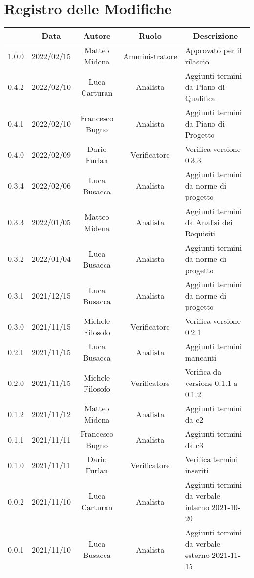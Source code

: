 \thispagestyle{empty}
\section*{Registro delle Modifiche}

\begin{center}
	\renewcommand{\arraystretch}{1.8}
	\begin{longtable}[c]{c | c | c | c | p{5cm}}
		\rowcolor[HTML]{125E28}
		\multicolumn{1}{c}{\color[HTML]{FFFFFF} \textbf{Versione}} & 
		\multicolumn{1}{c}{\color[HTML]{FFFFFF} \textbf{Data}} & 
		\multicolumn{1}{c}{\color[HTML]{FFFFFF} \textbf{Autore}} & 
		\multicolumn{1}{c}{\color[HTML]{FFFFFF} \textbf{Ruolo}} & 
		\multicolumn{1}{c}{\color[HTML]{FFFFFF} \textbf{Descrizione}} \\
		\endhead
		1.0.0 & 2022/02/15 & Matteo Midena & Amministratore & Approvato per il rilascio\\
		0.4.2 & 2022/02/10 & Luca Carturan & Analista & Aggiunti termini da Piano di Qualifica\\
		0.4.1 & 2022/02/10 & Francesco Bugno & Analista	& Aggiunti termini da Piano di Progetto\\
		0.4.0 & 2022/02/09 & Dario Furlan & Verificatore & Verifica versione 0.3.3\\
		0.3.4 & 2022/02/06 & Luca Busacca & Analista & Aggiunti termini da norme di progetto\\
		0.3.3 & 2022/01/05 & Matteo Midena & Analista & Aggiunti termini da Analisi dei Requisiti\\
		0.3.2 & 2022/01/04 & Luca Busacca & Analista & Aggiunti termini da norme di progetto\\
		0.3.1 & 2021/12/15 & Luca Busacca & Analista & Aggiunti termini da norme di progetto\\
		0.3.0 & 2021/11/15 & Michele Filosofo & Verificatore & Verifica versione 0.2.1\\
		0.2.1 & 2021/11/15 & Luca Busacca & Analista & Aggiunti termini mancanti\\
		0.2.0 & 2021/11/15 & Michele Filosofo & Verificatore & Verifica da versione 0.1.1 a 0.1.2\\
		0.1.2 & 2021/11/12 & Matteo Midena & Analista & Aggiunti termini da c2\\
		0.1.1 & 2021/11/11 & Francesco Bugno & Analista & Aggiunti termini da c3\\
		0.1.0 & 2021/11/11 & Dario Furlan & Verificatore & Verifica termini inseriti\\
		0.0.2 & 2021/11/10 & Luca Carturan & Analista & Aggiunti termini da verbale interno 2021-10-20\\
		0.0.1 & 2021/11/10 & Luca Busacca & Analista & Aggiunti termini da verbale esterno 2021-11-15\\

	\end{longtable}
\end{center}